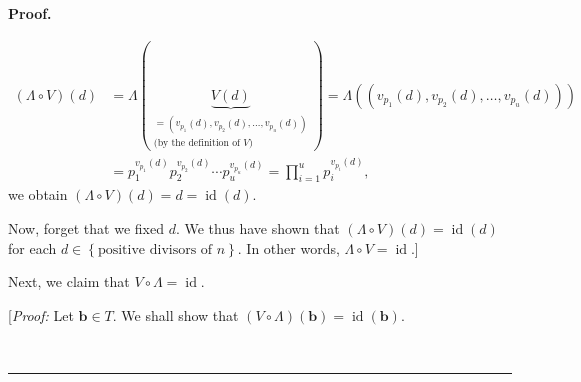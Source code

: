 \documentclass[numbers=enddot,12pt,final,onecolumn,notitlepage]{scrartcl}%
\numberwithin{exer}{subsection}
\theoremstyle{definition}
\newenvironment{fineprint}{\begin{small}}{\end{small}}
\newenvironment{proof}[1][Proof]{\noindent\textbf{#1.} }{\ \rule{0.5em}{0.5em}}
\let\prodnonlimits\prod
\renewcommand{\prod}{\prodnonlimits\limits}
\begin{document}
\begin{proof}
\begin{fineprint}
\begin{align*}
\left(  \Lambda\circ V\right)  \left(  d\right)   &  =\Lambda\left(
\underbrace{V\left(  d\right)  }_{\substack{=\left(  v_{p_{1}}\left(
d\right)  ,v_{p_{2}}\left(  d\right)  ,\ldots,v_{p_{u}}\left(  d\right)
\right)  \\\text{(by the definition of }V\text{)}}}\right)  =\Lambda\left(
\left(  v_{p_{1}}\left(  d\right)  ,v_{p_{2}}\left(  d\right)  ,\ldots
,v_{p_{u}}\left(  d\right)  \right)  \right) \\
&  =p_{1}^{v_{p_{1}}\left(  d\right)  }p_{2}^{v_{p_{2}}\left(  d\right)
}\cdots p_{u}^{v_{p_{u}}\left(  d\right)  }=\prod_{i=1}^{u}p_{i}^{v_{p_{i}%
}\left(  d\right)  },
\end{align*}
we obtain $\left(  \Lambda\circ V\right)  \left(  d\right)
=d=\operatorname*{id}\left(  d\right)  $.

Now, forget that we fixed $d$. We thus have shown that $\left(  \Lambda\circ
V\right)  \left(  d\right)  =\operatorname*{id}\left(  d\right)  $ for each
$d\in\left\{  \text{positive divisors of }n\right\}  $. In other words,
$\Lambda\circ V=\operatorname*{id}$.]
\end{fineprint}

Next, we claim that $V\circ\Lambda=\operatorname*{id}$.

\begin{fineprint}
[\textit{Proof:} Let $\mathbf{b}\in T$. We shall show that $\left(
V\circ\Lambda\right)  \left(  \mathbf{b}\right)  =\operatorname*{id}\left(
\mathbf{b}\right)  $.


\end{fineprint}
\end{proof}
\end{document}
